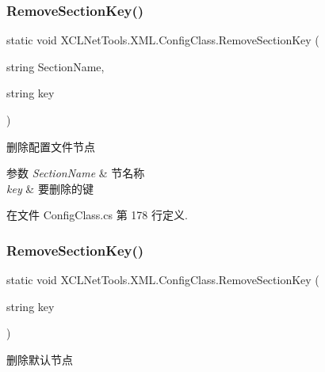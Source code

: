 \subsubsection{\texorpdfstring{Remove\+Section\+Key()}{RemoveSectionKey()}\hspace{0.1cm}{\footnotesize\ttfamily [1/2]}}
{\footnotesize\ttfamily static void X\+C\+L\+Net\+Tools.\+X\+M\+L.\+Config\+Class.\+Remove\+Section\+Key (\begin{DoxyParamCaption}\item[{string}]{Section\+Name,  }\item[{string}]{key }\end{DoxyParamCaption})\hspace{0.3cm}{\ttfamily [static]}}



删除配置文件节点 


\begin{DoxyParams}{参数}
{\em Section\+Name} & 节名称\\
\hline
{\em key} & 要删除的键\\
\hline
\end{DoxyParams}


在文件 Config\+Class.\+cs 第 178 行定义.

\mbox{\label{class_x_c_l_net_tools_1_1_x_m_l_1_1_config_class_a0f5d67dc3b088f2efc9a9b1118134a0b}} 
\subsubsection{\texorpdfstring{Remove\+Section\+Key()}{RemoveSectionKey()}\hspace{0.1cm}{\footnotesize\ttfamily [2/2]}}
{\footnotesize\ttfamily static void X\+C\+L\+Net\+Tools.\+X\+M\+L.\+Config\+Class.\+Remove\+Section\+Key (\begin{DoxyParamCaption}\item[{string}]{key }\end{DoxyParamCaption})\hspace{0.3cm}{\ttfamily [static]}}



删除默认节点 


